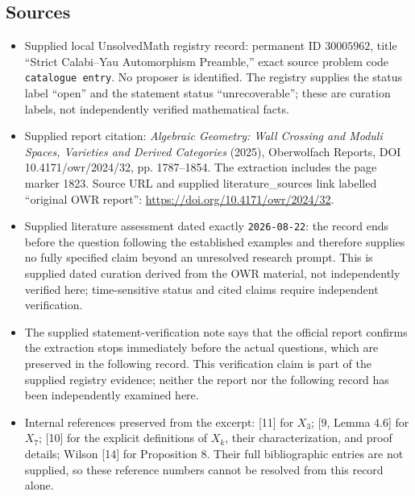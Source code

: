 \documentclass[11pt]{article}
\begin{document}
\subsection{Sources}
\begin{itemize}
\item Supplied local UnsolvedMath registry record: permanent ID \(30005962\), title ``Strict Calabi--Yau Automorphism Preamble,'' exact source problem code \texttt{catalogue entry}. No proposer is identified. The registry supplies the status label ``open'' and the statement status ``unrecoverable''; these are curation labels, not independently verified mathematical facts.
\item Supplied report citation: \emph{Algebraic Geometry: Wall Crossing and Moduli Spaces, Varieties and Derived Categories} (2025), Oberwolfach Reports, DOI 10.4171/owr/2024/32, pp. 1787--1854. The extraction includes the page marker 1823. Source URL and supplied literature\_sources link labelled ``original OWR report'': \url{https://doi.org/10.4171/owr/2024/32}.
\item Supplied literature assessment dated exactly \texttt{2026-08-22}: the record ends before the question following the established examples and therefore supplies no fully specified claim beyond an unresolved research prompt. This is supplied dated curation derived from the OWR material, not independently verified here; time-sensitive status and cited claims require independent verification.
\item The supplied statement-verification note says that the official report confirms the extraction stops immediately before the actual questions, which are preserved in the following record. This verification claim is part of the supplied registry evidence; neither the report nor the following record has been independently examined here.
\item Internal references preserved from the excerpt: [11] for \(X_3\); [9, Lemma 4.6] for \(X_7\); [10] for the explicit definitions of \(X_k\), their characterization, and proof details; Wilson [14] for Proposition 8. Their full bibliographic entries are not supplied, so these reference numbers cannot be resolved from this record alone.
\end{itemize}
\end{document}
